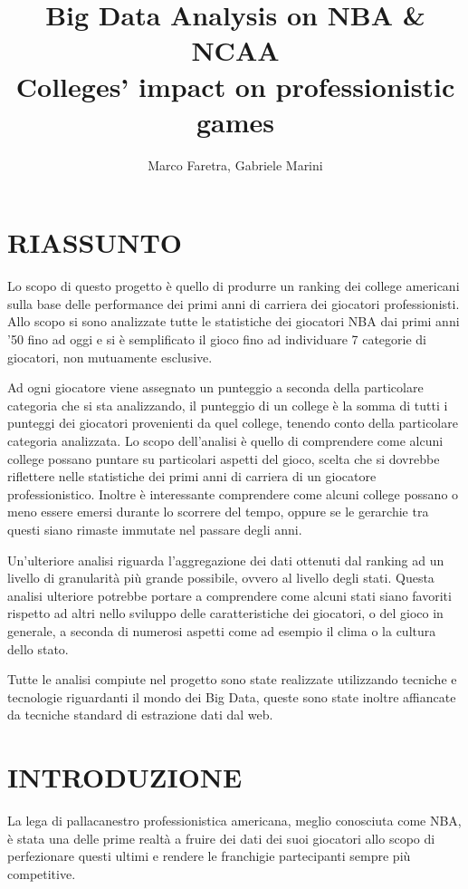 \documentclass[10.5pt,a4paper,twocolumn]{article}
\author{Marco Faretra, Gabriele Marini}
\title{\textbf{Big Data Analysis on NBA \& NCAA}\\Colleges' impact on professionistic games}
\begin{document}
	
\maketitle
\thispagestyle{empty}
\pagestyle{empty}
		
\section*{RIASSUNTO}

Lo scopo di questo progetto è quello di produrre un ranking dei college americani sulla base delle performance dei primi anni di carriera dei giocatori professionisti. Allo scopo si sono analizzate tutte le statistiche dei giocatori NBA dai primi anni '50 fino ad oggi e si è semplificato il gioco fino ad individuare 7 categorie di giocatori, non mutuamente esclusive.

Ad ogni giocatore viene assegnato un punteggio a seconda della particolare categoria che si sta analizzando, il punteggio di un college è la somma di tutti i punteggi dei giocatori provenienti da quel college, tenendo conto della particolare categoria analizzata. Lo scopo dell'analisi è quello di comprendere come alcuni college possano puntare su particolari aspetti del gioco, scelta che si dovrebbe riflettere nelle statistiche dei primi anni di carriera di un giocatore professionistico. Inoltre è interessante comprendere come alcuni college possano o meno essere emersi durante lo scorrere del tempo, oppure se le gerarchie tra questi siano rimaste immutate nel passare degli anni. 

Un'ulteriore analisi riguarda l'aggregazione dei dati ottenuti dal ranking ad un livello di granularità più grande possibile, ovvero al livello degli stati. Questa analisi ulteriore potrebbe portare a comprendere come alcuni stati siano favoriti rispetto ad altri nello sviluppo delle caratteristiche dei giocatori, o del gioco in generale, a seconda di numerosi aspetti come ad esempio il clima o la cultura dello stato.

Tutte le analisi compiute nel progetto sono state realizzate utilizzando tecniche e tecnologie riguardanti il mondo dei Big Data, queste sono state inoltre affiancate da tecniche standard di estrazione dati dal web.

\section{INTRODUZIONE} 

La lega di pallacanestro professionistica americana, meglio conosciuta come NBA, è stata una delle prime realtà a fruire dei dati dei suoi giocatori allo scopo di perfezionare questi ultimi e rendere le franchigie partecipanti sempre più competitive. 
\end{document}
